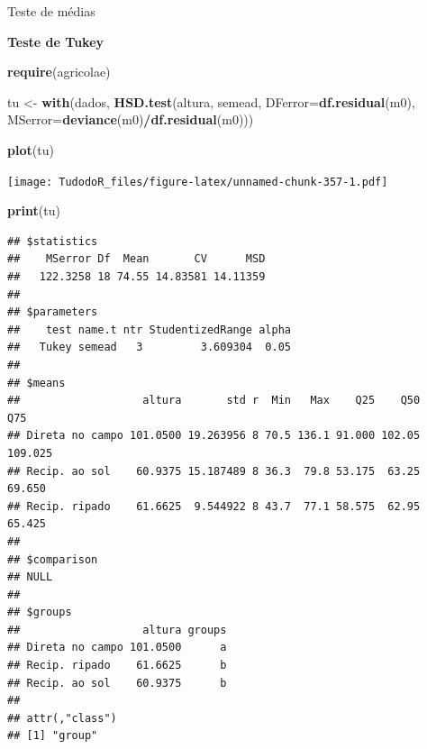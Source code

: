 \documentclass[
]{book}
\newenvironment{Shaded}{\begin{snugshade}}{\end{snugshade}}
\newcommand{\DataTypeTok}[1]{\textcolor[rgb]{0.13,0.29,0.53}{#1}}
\newcommand{\KeywordTok}[1]{\textcolor[rgb]{0.13,0.29,0.53}{\textbf{#1}}}
\newcommand{\NormalTok}[1]{#1}
\newcommand{\OperatorTok}[1]{\textcolor[rgb]{0.81,0.36,0.00}{\textbf{#1}}}
\newcommand{\StringTok}[1]{\textcolor[rgb]{0.31,0.60,0.02}{#1}}
\begin{document}
Teste de médias

\textbf{Teste de Tukey}

\begin{Shaded}
\begin{Highlighting}[]
\KeywordTok{require}\NormalTok{(agricolae)}
\end{Highlighting}
\end{Shaded}

\begin{Shaded}
\begin{Highlighting}[]
\NormalTok{tu <-}\StringTok{ }\KeywordTok{with}\NormalTok{(dados, }\KeywordTok{HSD.test}\NormalTok{(altura, semead,}
\DataTypeTok{DFerror=}\KeywordTok{df.residual}\NormalTok{(m0),}
\DataTypeTok{MSerror=}\KeywordTok{deviance}\NormalTok{(m0)}\OperatorTok{/}\KeywordTok{df.residual}\NormalTok{(m0)))}
\end{Highlighting}
\end{Shaded}

\begin{Shaded}
\begin{Highlighting}[]
\KeywordTok{plot}\NormalTok{(tu)}
\end{Highlighting}
\end{Shaded}

\texttt{[image: TudodoR\_files/figure-latex/unnamed-chunk-357-1.pdf]}

\begin{Shaded}
\begin{Highlighting}[]
\KeywordTok{print}\NormalTok{(tu)}
\end{Highlighting}
\end{Shaded}

\begin{verbatim}
## $statistics
##    MSerror Df  Mean       CV      MSD
##   122.3258 18 74.55 14.83581 14.11359
## 
## $parameters
##    test name.t ntr StudentizedRange alpha
##   Tukey semead   3         3.609304  0.05
## 
## $means
##                   altura       std r  Min   Max    Q25    Q50     Q75
## Direta no campo 101.0500 19.263956 8 70.5 136.1 91.000 102.05 109.025
## Recip. ao sol    60.9375 15.187489 8 36.3  79.8 53.175  63.25  69.650
## Recip. ripado    61.6625  9.544922 8 43.7  77.1 58.575  62.95  65.425
## 
## $comparison
## NULL
## 
## $groups
##                   altura groups
## Direta no campo 101.0500      a
## Recip. ripado    61.6625      b
## Recip. ao sol    60.9375      b
## 
## attr(,"class")
## [1] "group"
\end{verbatim}
\end{document}
